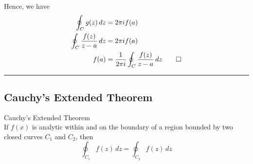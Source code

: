 Hence, we have
\begin{align*}
    \oint_C g(z) \, dz &= 2\pi i f(a) \\
    \oint_C \frac{f(z)}{z-a} \, dz &= 2\pi i f(a) \\
    f(a) &= \frac{1}{2\pi i} \oint_C \frac{f(z)}{z-a} \, dz \qed
\end{align*}

\vspace{20pt}\rule{3in}{1pt}


\subsection{Cauchy's Extended Theorem}
\begin{theorem}{Cauchy's Extended Theorem}{}
    \\If $f(x)$ is analytic within and on the boundary of a region bounded by two closed curves $C_1$ and $C_2$, then
    \begin{equation}
        \oint_{C_1} f(z) \, dz = \oint_{C_2} f(z) \, dz
    \end{equation}
\end{theorem}
